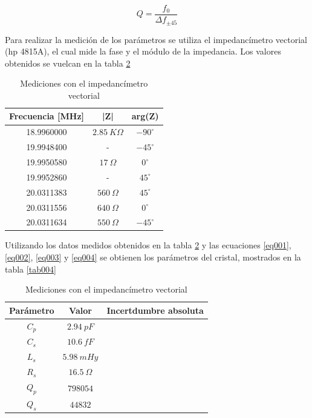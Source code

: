 \documentclass[a4paper,10pt]{article}
\begin{document}
		\begin{equation} \label{eq004}
			Q = \frac{f_0}{\Delta f_{\pm45}}
		\end{equation}
		
		\indent Para realizar la medición de los parámetros se utiliza el 
		impedancímetro vectorial (hp 4815A), el cual mide la fase y el módulo de
		la impedancia. Los valores obtenidos se vuelcan en la tabla \ref{tab003}
		\begin{table}[!htp]
			\centering
			\begin{tabular}{|c|c|c|}
				\hline
				Frecuencia [MHz] & |Z| & arg(Z) \\
				\hline
				18.9960000 & $2.85~K\Omega$ & $-90^{\circ}$ \\
				\hline
				19.9948400 & - & $-45^{\circ}$ \\ 
				\hline
				19.9950580 & $17~\Omega$ & $0^{\circ}$ \\
				\hline
				19.9952860 & - & $45^{\circ}$ \\ 
				\hline									
				20.0311383 & $560~\Omega$ & $45^{\circ}$ \\
				\hline									
				20.0311556 & $640~\Omega$ & $0^{\circ}$ \\
				\hline									
				20.0311634 & $550~\Omega$ & $-45^{\circ}$ \\
				\hline									
			\end{tabular}
			\caption{Mediciones con el impedancímetro vectorial} \label{tab003}
		\end{table}	
		
		\indent Utilizando los datos medidos obtenidos en la tabla \ref{tab003}
		y las ecuaciones \ref{eq001}, \ref{eq002}, \ref{eq003} y \ref{eq004} se
		obtienen los parámetros del cristal, mostrados en la tabla \ref{tab004}
		\begin{table}[!htp]
			\centering
			\begin{tabular}{|c|c|c|}
				\hline
				Parámetro & Valor & Incertdumbre absoluta \\
				\hline
				$C_p$ & $2.94~pF$ & \\
				\hline
				$C_s$ & $10.6~fF$ & \\ 
				\hline
				$L_s$ & $5.98~mHy$ & \\
				\hline
				$R_s$ & $16.5~\Omega$ & \\ 
				\hline									
				$Q_p$ & $798054$ & \\
			\hline
				$Q_s$ & $44832$  & \\
				\hline
			\end{tabular}
			\caption{Mediciones con el impedancímetro vectorial} \label{tab003}
		\end{table}	
\end{document}
